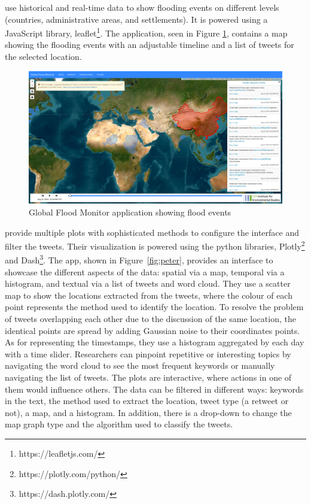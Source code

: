  use historical and real-time data to show flooding
events on different levels (countries, administrative areas, and settlements). It is powered using a
JavaScript library, leaflet\footnote{https://leafletjs.com/}. The application, seen in Figure
\ref{fig:global}, contains a map showing the flooding events with an adjustable timeline and a list
of tweets for the selected location.


\begin{figure}[ht!]
\begin{center}
  \includegraphics[width=\columnwidth]{images/global.png}
\end{center}
\caption{Global Flood Monitor application showing flood events}
\label{fig:global}
\end{figure}

 provide multiple plots with sophisticated
methods to configure the interface and filter the tweets. Their visualization is powered using the python
libraries, Plotly\footnote{https://plotly.com/python/} and Dash\footnote{https://dash.plotly.com/}.
The app, shown in Figure~\ref{fig:peter}, provides an interface to showcase the different aspects of the
data: spatial via a map, temporal via a histogram, and textual via a list of tweets and word cloud.
They use a scatter map to show the locations extracted from the tweets, where the colour of each
point represents the method used to identify the location. To resolve the problem of tweets
overlapping each other due to the discussion of the same location, the identical points are
spread by adding Gaussian noise to their coordinates points. As for representing the timestamps,
they use a histogram aggregated by each day with a time slider. Researchers can pinpoint repetitive
or interesting topics by navigating the word cloud to see the most frequent keywords or manually
navigating the list of tweets. The plots are interactive, where actions in one of them would
influence others. The data can be filtered in different ways: keywords in the text, the method used
to extract the location, tweet type (a retweet or not), a map, and a histogram. In addition, there is a
drop-down to change the map graph type and the algorithm used to classify the tweets.

